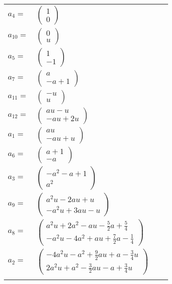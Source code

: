 \documentclass[1p]{elsarticle_modified}
\theoremstyle{definition}
\begin{document}
\begin{tabular}{m{7pt} m{180pt} m{7pt} m{180pt} }
\flushright $a_{4}=$&$\begin{pmatrix}1\\0\end{pmatrix}$ \\
\flushright $a_{10}=$&$\begin{pmatrix}0\\u\end{pmatrix}$ \\
\flushright $a_{5}=$&$\begin{pmatrix}1\\-1\end{pmatrix}$ \\
\flushright $a_{7}=$&$\begin{pmatrix}a\\- a+1\end{pmatrix}$ \\
\flushright $a_{11}=$&$\begin{pmatrix}- u\\u\end{pmatrix}$ \\
\flushright $a_{12}=$&$\begin{pmatrix}a u- u\\- a u+2 u\end{pmatrix}$ \\
\flushright $a_{1}=$&$\begin{pmatrix}a u\\- a u+u\end{pmatrix}$ \\
\flushright $a_{6}=$&$\begin{pmatrix}a+1\\- a\end{pmatrix}$ \\
\flushright $a_{3}=$&$\begin{pmatrix}- a^2- a+1\\a^2\end{pmatrix}$ \\
\flushright $a_{9}=$&$\begin{pmatrix}a^2 u-2 a u+u\\- a^2 u+3 a u- u\end{pmatrix}$ \\
\flushright $a_{8}=$&$\begin{pmatrix}a^2 u+2 a^2- a u-\frac{5}{2} a+\frac{5}{4}\\- a^2 u-4 a^2+a u+\frac{7}{2} a-\frac{1}{4}\end{pmatrix}$ \\
\flushright $a_{2}=$&$\begin{pmatrix}-4 a^2 u- a^2+\frac{9}{2} a u+a-\frac{3}{4} u\\2 a^2 u+a^2-\frac{3}{2} a u- a+\frac{3}{4} u\end{pmatrix}$\\&\end{tabular}
\end{document}
